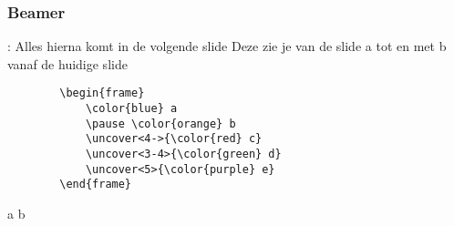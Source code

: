 \begin{frame}[fragile=singleslide]
	\frametitle{Beamer}
	\texttt{\pause}: Alles hierna komt in de volgende slide
	\texttt{\uncover<a-b>} Deze zie je van de slide a tot en met b vanaf de huidige slide
	\begin{verbatim}
		\begin{frame}
			\color{blue} a 
			\pause \color{orange} b 
			\uncover<4->{\color{red} c}
			\uncover<3-4>{\color{green} d}
			\uncover<5>{\color{purple} e}
		\end{frame}
	\end{verbatim}
\end{frame}
\begin{frame}
	\color{blue} a 
	\pause \color{orange} b 
	\uncover<4->{\color{red} c}
	\uncover<3-4>{\color{green} d}
	\uncover<5>{\color{purple} e}
\end{frame}
